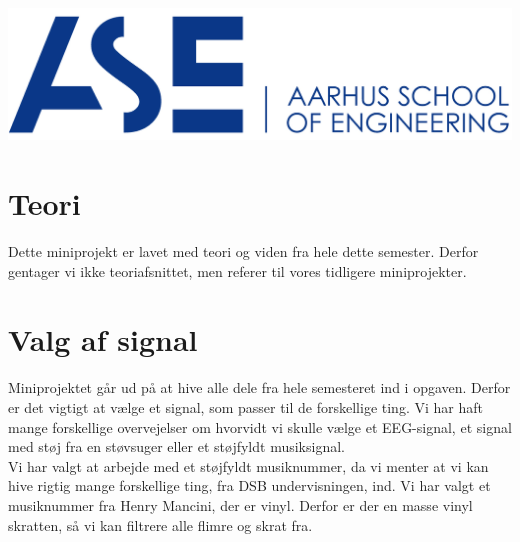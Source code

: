\documentclass[12pt, letterpaper]{article}
\begin{document}
\begin{titlepage}

\includegraphics[scale=0.5]{billeder/au}\\ %
 

\vfill %


\end{titlepage}

\tableofcontents
\newpage


\section{Teori}
Dette miniprojekt er lavet med teori og viden fra hele dette semester. Derfor gentager vi ikke teoriafsnittet, men referer til vores tidligere miniprojekter.

\section{Valg af signal}
Miniprojektet går ud på at hive alle dele fra hele semesteret ind i opgaven. Derfor er det vigtigt at vælge et signal, som passer til de forskellige ting. Vi har haft mange forskellige overvejelser om hvorvidt vi skulle vælge et EEG-signal, et signal med støj fra en støvsuger eller et støjfyldt musiksignal. \\
Vi har valgt at arbejde med et støjfyldt musiknummer, da vi menter at vi kan hive rigtig mange forskellige ting, fra DSB undervisningen, ind. 
Vi har valgt et musiknummer fra Henry Mancini, der er vinyl. Derfor er der en masse vinyl skratten, så vi kan filtrere alle flimre og skrat fra.   
\end{document}
